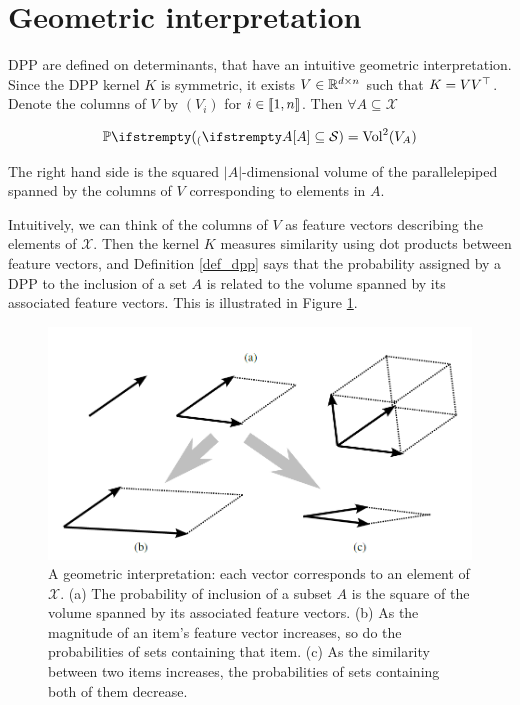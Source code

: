 \section{Geometric interpretation}
DPP are defined on determinants, that have an intuitive geometric interpretation. Since the DPP kernel $K$ is symmetric, it exists $V \in \mathbb{R}^{d \times n}$ such that $K= V V^\top$. 
Denote the columns of $V$ by $(V_i)$ for $i\in \llbracket 1,n \rrbracket$. Then $\forall A \subseteq \mathcal{X}$

\begin{equation}
    \PP(A \subseteq \mathcal{S}) = \operatorname{Vol}^2(V_A)
\end{equation}

The right hand side is the squared $|A|$-dimensional volume of the parallelepiped
spanned by the columns of $V$ corresponding to elements in $A$.

Intuitively, we can think of the columns of $V$ as feature vectors describing the elements
of $\mathcal{X}$. Then the kernel $K$ measures similarity using dot products between feature vectors, and Definition \ref{def_dpp} says that the probability assigned by a DPP to the inclusion of a set $A$ is related to the volume spanned by its associated feature vectors. This is illustrated in Figure \ref{fig_geometric_interpret}.

\begin{figure}[!ht]
    \centering
    \includegraphics[width=0.8\linewidth]{pics/geometric_interpret.png}
    \caption{A geometric interpretation: each vector corresponds to an element of $\mathcal{X}$. (a) The  probability of inclusion of a subset $A$ is the square of the volume spanned by its associated feature vectors. (b) As the magnitude of an item's feature vector increases, so do the probabilities of sets containing that item. (c) As the similarity between two items increases, the probabilities of sets containing both of them decrease.}
    \label{fig_geometric_interpret}
\end{figure}

